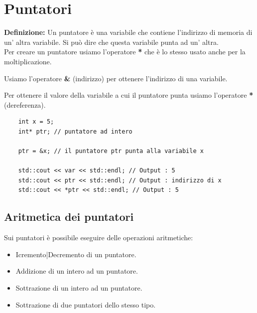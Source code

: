 

\newpage

\section{Puntatori}

\textsf{\small \textbf{Definizione: } Un puntatore è una variabile che contiene l'indirizzo di memoria di un' altra variabile. Si può dire che questa variabile punta ad un' altra.} \\

\textsf{\small Per creare un puntatore usiamo l'operatore \textbf{*} che è lo stesso usato anche per la moltiplicazione.}

\textsf{\small Usiamo l'operatore \textbf{\&} (indirizzo) per ottenere l'indirizzo di una variabile.} 

\textsf{\small Per ottenere il valore della variabile a cui il puntatore punta usiamo l'operatore \textbf{*} (dereferenza).}\\

\begin{lstlisting}
	int x = 5;
	int* ptr; // puntatore ad intero
	
	ptr = &x; // il puntatore ptr punta alla variabile x
	
	std::cout << var << std::endl; // Output : 5
	std::cout << ptr << std::endl; // Output : indirizzo di x
	std::cout << *ptr << std::endl; // Output : 5
\end{lstlisting}

\subsection{Aritmetica dei puntatori}

\textsf{\small Sui puntatori è possibile eseguire delle operazioni aritmetiche:} \\

\begin{itemize}
	\item \textsf{\small Icremento|Decremento di un puntatore.}
	\item \textsf{\small Addizione di un intero ad un puntatore.}
	\item \textsf{\small Sottrazione di un intero ad un puntatore.}
	\item \textsf{\small Sottrazione di due puntatori dello stesso tipo.}
\end{itemize}


